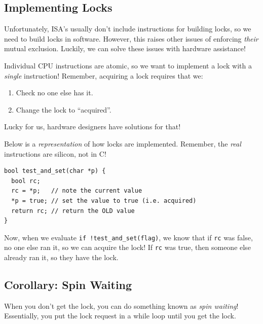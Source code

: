 \documentclass{report}
\newcommand{\exampleBegin}[1]{\begin{tcolorbox}[colback=blue!5!white,colframe=black!75!blue,title={Example:
      #1}]}
\newcommand{\exampleEnd}{\end{tcolorbox}}
\begin{document}
\subsection*{Implementing Locks}
Unfortunately, ISA's usually don't include instructions for building locks, so we need to build
locks in software. However, this raises other issues of enforcing \textit{their} mutual
exclusion. Luckily, we can solve these issues with hardware assistance!

Individual CPU instructions are atomic, so we want to implement a lock with a \textit{single}
instruction! Remember, acquiring a lock requires that we:
\begin{enumerate}[label=\textit{(\roman*)}]
\item Check no one else has it.
\item Change the lock to ``acquired''.
\end{enumerate}
Lucky for us, hardware designers have solutions for that!


\exampleBegin{Test and Set}
Below is a \textit{representation} of how locks are implemented. Remember, the \textit{real}
instructions are silicon, not in C!

\begin{verbatim}
bool test_and_set(char *p) {
  bool rc;
  rc = *p;   // note the current value
  *p = true; // set the value to true (i.e. acquired)
  return rc; // return the OLD value
}
\end{verbatim}
Now, when we evaluate \texttt{if !test\_and\_set(flag)}, we know that if \texttt{rc} was false, no
one else ran it, so we can acquire the lock! If \texttt{rc} was true, then someone else already ran
it, so they have the lock.
\exampleEnd


\subsection*{Corollary: Spin Waiting}
When you don't get the lock, you can do something known as \textit{spin waiting}! Essentially, you
put the lock request in a while loop until you get the lock.
\end{document}
